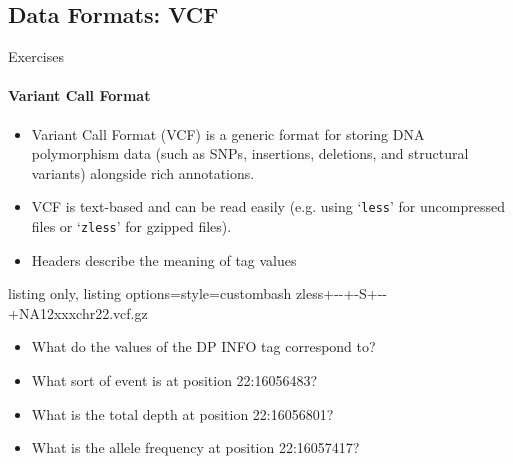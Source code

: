 \documentclass{beamer}
\begin{document}
%


\subsection{Data Formats: VCF}
\begin{frame}[fragile]{Exercises}
\framesubtitle{Variant Call Format}
\begin{itemize}
\item Variant Call Format (VCF) is a generic format for storing DNA polymorphism data (such as SNPs, insertions, deletions, and structural variants) alongside rich annotations.
\item VCF is text-based and can be read easily (e.g. using `\texttt{less}' for uncompressed files or `\texttt{zless}' for gzipped files).
\item Headers describe the meaning of tag values
\end{itemize}
\begin{tcblisting}{listing only, listing options={style=custombash}}
zless+-\quad -+-S+-\quad -+NA12xxxchr22.vcf.gz
\end{tcblisting}
\begin{itemize}
\item What do the values of the DP INFO tag correspond to?
\item What sort of event is at position 22:16056483?
\item What is the total depth at position 22:16056801?
\item What is the allele frequency at position 22:16057417?
\end{itemize}
\end{frame}
\end{document}
